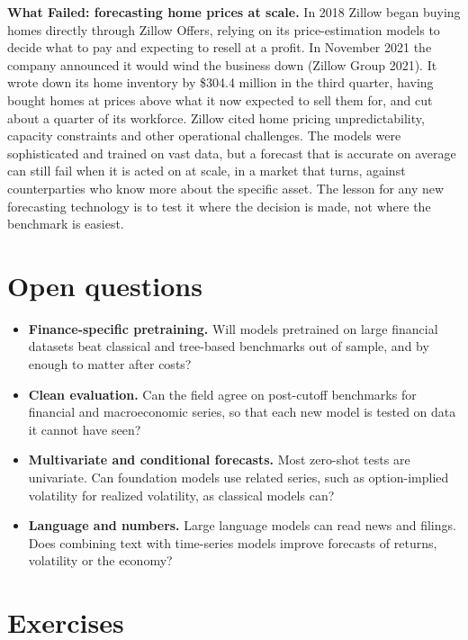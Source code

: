 \begin{callout}
\textbf{What Failed: forecasting home prices at scale.} In 2018 Zillow began buying homes directly through Zillow Offers, relying on its price-estimation models to decide what to pay and expecting to resell at a profit. In November 2021 the company announced it would wind the business down (Zillow Group 2021). It wrote down its home inventory by \$304.4 million in the third quarter, having bought homes at prices above what it now expected to sell them for, and cut about a quarter of its workforce. Zillow cited home pricing unpredictability, capacity constraints and other operational challenges. The models were sophisticated and trained on vast data, but a forecast that is accurate on average can still fail when it is acted on at scale, in a market that turns, against counterparties who know more about the specific asset. The lesson for any new forecasting technology is to test it where the decision is made, not where the benchmark is easiest.
\end{callout}

\section{Open questions}
\label{sec:21-open}

\begin{itemize}
  \item \textbf{Finance-specific pretraining.} Will models pretrained on large financial datasets beat classical and tree-based benchmarks out of sample, and by enough to matter after costs?
  \item \textbf{Clean evaluation.} Can the field agree on post-cutoff benchmarks for financial and macroeconomic series, so that each new model is tested on data it cannot have seen?
  \item \textbf{Multivariate and conditional forecasts.} Most zero-shot tests are univariate. Can foundation models use related series, such as option-implied volatility for realized volatility, as classical models can?
  \item \textbf{Language and numbers.} Large language models can read news and filings. Does combining text with time-series models improve forecasts of returns, volatility or the economy?
\end{itemize}

\section*{Exercises}

